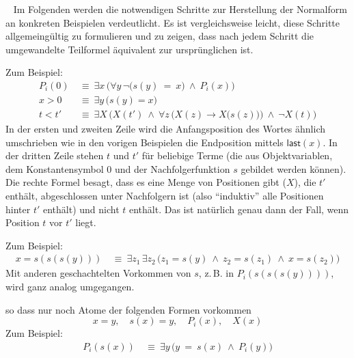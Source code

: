 \documentclass[fontsize=11pt, twoside=false, numbers=autoenddot]{scrbook}
\begin{document}
\begin{beweis}
  ~
  Im Folgenden werden die notwendigen Schritte zur Herstellung der Normalform
  an konkreten Beispielen verdeutlicht.
  Es ist vergleichsweise leicht, diese Schritte allgemeingültig zu formulieren
  und zu zeigen, dass nach jedem Schritt die umgewandelte Teilformel
  äquivalent zur ursprünglichen ist.

  \par\medskip\noindent

  Zum Beispiel:
  \begin{align*}
    P_i(0) & ~\equiv~ \exists x\,\Big(\forall y\,\lnot \big(s(y) \!\!\:=\!\!\: x\big) ~\land~ P_i(x)\Big) \\
    x > 0 & ~\equiv~ \exists y\,\Big(s(y)=x\Big) \\
    t < t' & ~\equiv~ \exists X\,\bigg(X(t') ~\land~ \forall z\,\Big(X(z) \to X\big(s(z)\big)\Big) ~\land~ \lnot X(t) \bigg)
  \end{align*}
  In der ersten und zweiten Zeile wird die Anfangsposition des Wortes ähnlich umschrieben
  wie in den vorigen Beispielen die Endposition mittels $\textsf{last}(x)$.
  In der dritten Zeile stehen $t$ und $t'$ für beliebige Terme
  (die aus Objektvariablen, dem Konstantensymbol 0 und der Nachfolgerfunktion $s$
  gebildet werden können). Die rechte Formel besagt, dass es eine Menge
  von Positionen gibt ($X$), die $t'$ enthält, abgeschlossen unter Nachfolgern ist
  (also "`induktiv"' alle Positionen hinter $t'$ enthält) und nicht $t$ enthält.
  Das ist natürlich genau dann der Fall, wenn Position $t$ vor $t'$ liegt.

  \par\medskip\noindent

  Zum Beispiel:
  \begin{align*}
    x = s(s(s(y))) & ~\equiv~ \exists z_1\, \exists z_2\, \Big(z_1 = s(y) ~\land~ z_2 = s(z_1) ~\land~ x = s(z_2)\Big)
  \end{align*}
  Mit anderen geschachtelten Vorkommen von $s$, z.\,B. in $P_i(s(s(s(y))))$,
  wird ganz analog umgegangen.

  \par\medskip\noindent
   so dass nur noch Atome der folgenden Formen vorkommen
  \[
    x=y,\quad s(x)=y,\quad P_i(x),\quad X(x)
  \]
  Zum Beispiel:
  \begin{align*}
    P_i(s(x)) & ~\equiv~ \exists y\,\Big(y \!\!\:=\!\!\: s(x) ~\land~ P_i(y)\Big)
  \end{align*}


\end{beweis}
\end{document}
